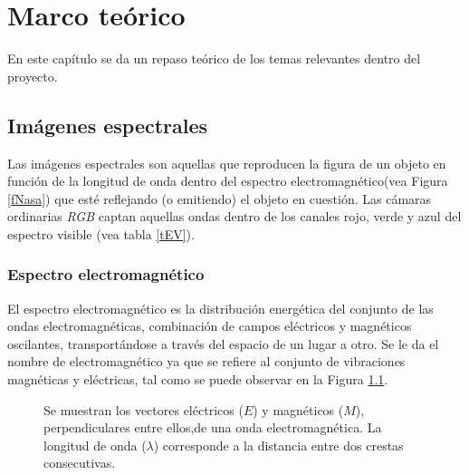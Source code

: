 \chapter{Marco teórico} 
\label{Capitulo2} 
En este capítulo se da un repaso teórico de los temas relevantes dentro del proyecto.

\section{Imágenes espectrales} 
Las imágenes espectrales son aquellas que reproducen la figura de un objeto en función de la longitud de onda dentro del espectro electromagnético(vea Figura \ref{fNasa}) que esté reflejando (o emitiendo) el objeto en cuestión. Las cámaras ordinarias \textit{RGB} captan aquellas ondas dentro de los canales rojo, verde y azul del espectro visible (vea tabla \ref{tEV}).
\subsection{Espectro electromagnético}
El espectro electromagnético es la distribución energética del conjunto de las ondas electromagnéticas, combinación de campos eléctricos y magnéticos oscilantes, transportándose a través del espacio de un lugar a otro. Se le da el nombre de electromagnético ya que se refiere al conjunto de vibraciones magnéticas y eléctricas, tal como se puede observar en la Figura \ref{fPropagacion}.

\begin{figure}[h]
  \centering
  \centering
  \caption{Se muestran los vectores eléctricos ($E$) y magnéticos ($M$), perpendiculares entre ellos,de una onda electromagnética. La longitud de onda ($\lambda$) corresponde a la distancia entre dos crestas consecutivas. \cite{chile}}
  \label{fPropagacion}
\end{figure}

